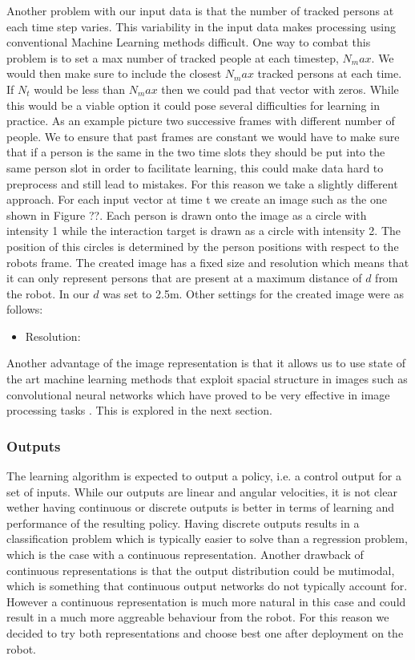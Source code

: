 \documentclass[a4paper,11pt]{report}
\begin{document}
Another problem with our input data is that the number of tracked persons at each time step varies. This variability in the input data makes processing using conventional Machine Learning methods difficult. One way to combat this problem is to set a max number of tracked people at each timestep, $N_max$. We would then make sure to include the closest $N_max$ tracked persons at each time. If $N_t$ would be less than $N_max$ then we could pad that vector with zeros. While this would be a viable option it could pose several difficulties for learning in practice. As an example picture two successive frames with different number of people. We to ensure that past frames are constant we would have to make sure that if a person is the same in the two time slots they should be put into the same person slot in order to facilitate learning, this could make data hard to preprocess and still lead to mistakes. For this reason we take a slightly different approach. For each input vector at time t we create an image such as the one shown in Figure ??. Each person is drawn onto the image as a circle with intensity 1 while the interaction target is drawn as a circle with intensity 2. The position of this circles is determined by the person positions with respect to the robots frame. The created image has a fixed size and resolution which means that it can only represent persons that are present at a maximum distance of $d$ from the robot. In our $d$ was set to 2.5m. Other settings for the created image were as follows:

\begin{itemize}
	\item Resolution:
\end{itemize}

Another advantage of the image representation is that it allows us to use state of the art machine learning methods that exploit spacial structure in images such as convolutional neural networks which have proved to be very effective in image processing tasks \cite{krizhevsky2012imagenet}. This is explored in the next section.

\subsubsection{Outputs}
The learning algorithm is expected to output a policy, i.e. a control output for a set of inputs. While our outputs are linear and angular velocities, it is not clear wether having continuous or discrete outputs is better in terms of learning and performance of the resulting policy. Having discrete outputs results in a classification problem which is typically easier to solve than a regression problem, which is the case with a continuous representation. Another drawback of continuous representations is that the output distribution could be mutimodal, which is something that continuous output networks do not typically account for. However a continuous representation is much more natural in this case and could result in a much more aggreable behaviour from the robot. For this reason we decided to try both representations and choose best one after deployment on the robot. 
\end{document}

